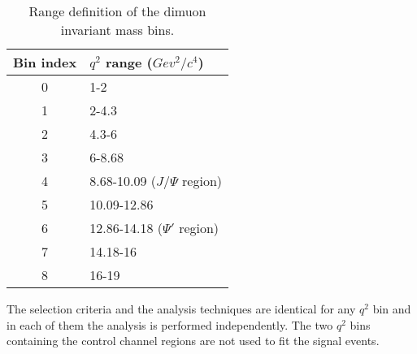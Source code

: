 \begin{table}[!htb]
  \begin{center}
    \begin{small}
      \caption{Range definition of the dimuon invariant mass bins.
        \label{tab:q2bins}}
      \begin{tabular}{c|l}
        Bin index & $q^2$ range ($Gev^2/c^4$) \\
        \hline
        0 & 1-2  \\
        1 & 2-4.3  \\
        2 & 4.3-6  \\
        3 & 6-8.68   \\
        4 & 8.68-10.09 ($J/\Psi$ region) \\
        5 & 10.09-12.86\\
        6 & 12.86-14.18 ($\Psi'$ region)\\
        7 & 14.18-16\\
        8 & 16-19\\
      \end{tabular}
    \end{small}
  \end{center}
\end{table}

The selection criteria and the analysis techniques are identical for any $q^2$ bin and in each of them the analysis is performed independently.
The two $q^2$ bins containing the control channel regions are not used to fit the signal events.


  
